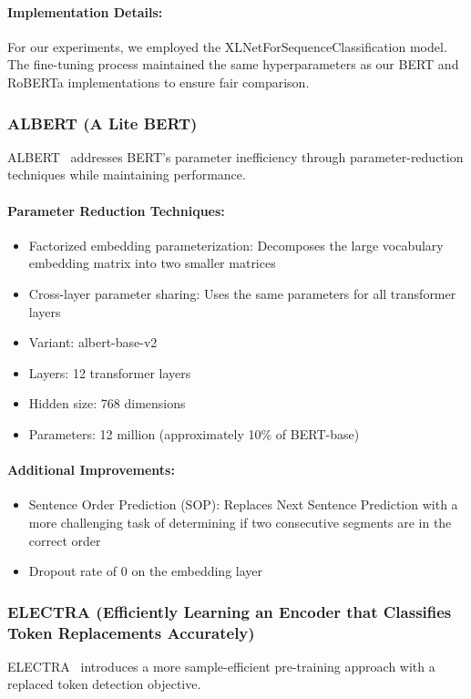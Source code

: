 \documentclass[12pt]{article}
\begin{document}
\paragraph{Implementation Details:}
For our experiments, we employed the XLNetForSequenceClassification model. The fine-tuning process maintained the same hyperparameters as our BERT and RoBERTa implementations to ensure fair comparison.

\subsubsection{ALBERT (A Lite BERT)}
ALBERT~\cite{lan2019albert} addresses BERT's parameter inefficiency through parameter-reduction techniques while maintaining performance.

\paragraph{Parameter Reduction Techniques:}
\begin{itemize}
    \item Factorized embedding parameterization: Decomposes the large vocabulary embedding matrix into two smaller matrices
    \item Cross-layer parameter sharing: Uses the same parameters for all transformer layers
    \item Variant: albert-base-v2
    \item Layers: 12 transformer layers
    \item Hidden size: 768 dimensions
    \item Parameters: 12 million (approximately 10\% of BERT-base)
\end{itemize}

\paragraph{Additional Improvements:}
\begin{itemize}
    \item Sentence Order Prediction (SOP): Replaces Next Sentence Prediction with a more challenging task of determining if two consecutive segments are in the correct order
    \item Dropout rate of 0 on the embedding layer
\end{itemize}

\subsubsection{ELECTRA (Efficiently Learning an Encoder that Classifies Token Replacements Accurately)}
ELECTRA~\cite{clark2020electra} introduces a more sample-efficient pre-training approach with a replaced token detection objective.
\end{document}
